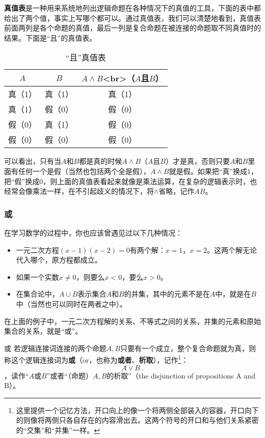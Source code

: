 \textbf{真值表}是一种用来系统地列出逻辑命题在各种情况下的真值的工具，下面的表中都给出了两个值，事实上写哪个都可以。通过真值表，我们可以清楚地看到，真值表前面两列是各个命题的真值，最后一列是复合命题在被连接的命题取不同真值时的结果。下面是“且”的真值表。

\begin{table}[ht]
\centering
\caption{“且”真值表}\label{tab_HsCoPr1}
\begin{tabular}{|c|c|c|}
\hline
$A$ & $B$ & $A \land B$<br>（$A$且$B$） \\
\hline
真（1） & 真（1） & 真（1） \\
\hline
真（1） & 假（0） & 假（0）\\
\hline
假（0） & 真（1） & 假（0）\\
\hline
假（0） & 假（0） & 假（0） \\
\hline
\end{tabular}
\end{table}

可以看出，只有当$A$和$B$都是真的时候$A\land B$（$A$且$B$）才是真，否则只要$A$和$B$里面有任何一个是假（当然也包括两个全是假），$A\land B$就是假。如果把“真”换成$1$，把“假”换成$0$，则上面的真值表看起来就像是乘法运算，在复杂的逻辑表示时，也经常会像乘法一样，在不引起歧义的情况下，将$\land$省略，记作$AB$。

\subsubsection{或}

在学习数学的过程中，你也应该曾遇见过以下几种情况：
\begin{itemize}
\item 一元二次方程$(x-1)(x-2)=0$有两个解：$x=1$，$x=2$。这两个解无论代入哪个，原方程都成立。
\item 如果一个实数$x\neq0$，则要么$x<0$，要么$x>0$。
\item 在集合论中，$A \cup B$表示集合$A$和$B$的并集，其中的元素不是在$A$中，就是在$B$中（当然也可以同时在两者之中）。
\end{itemize}
在上面的例子中，一元二次方程解的关系、不等式之间的关系，并集的元素和原始集合的关系，就是“或”。
\begin{definition}{或}\label{def_HsCoPr_2}
若逻辑连接词连接的两个命题$A,B$只要有一个成立，整个复合命题就为真，则称这个逻辑连接词为\textbf{或}（or，也称为\textbf{或者}、\textbf{析取}），记作\footnote{这里提供一个记忆方法，开口向上的像一个将两侧全部装入的容器，开口向下的则像将两侧只各自存在的内容滑出去。这两个符号的开口和与他们关系紧密的“交集”和“并集”一样。}：
\begin{equation}
A\lor B~.
\end{equation}
，读作“$A$或$B$”或者“（命题）$A,B$的析取”（the disjunction of propositions A and B）。
\end{definition}

